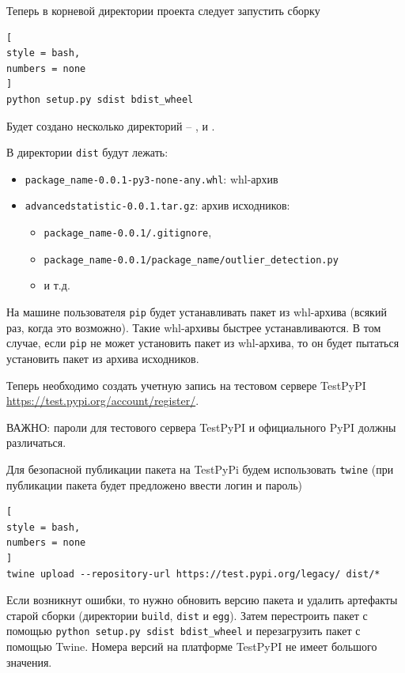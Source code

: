 \documentclass[%
	11pt,
	a4paper,
	utf8,
		]{article}
\begin{document}
Теперь в корневой директории проекта следует запустить сборку
\begin{lstlisting}[
style = bash,
numbers = none	
]
python setup.py sdist bdist_wheel
\end{lstlisting}

Будет создано несколько директорий -- ,  и .

В директории \texttt{dist} будут лежать:
\begin{itemize}
	\item \texttt{package\_name-0.0.1-py3-none-any.whl}: whl-архив
	
	\item \texttt{advancedstatistic-0.0.1.tar.gz}: архив исходников:
	\begin{itemize}
		\item \texttt{package\_name-0.0.1/.gitignore},
		
		\item \texttt{package\_name-0.0.1/package\_name/outlier\_detection.py}
		
		\item и т.д.
	\end{itemize}
\end{itemize}

На машине пользователя \texttt{pip} будет устанавливать пакет из whl-архива (всякий раз, когда это возможно). Такие whl-архивы быстрее устанавливаются. В том случае, если \texttt{pip} не может установить пакет из whl-архива, то он будет пытаться установить пакет из архива исходников.

Теперь необходимо создать учетную запись на тестовом сервере TestPyPI \url{https://test.pypi.org/account/register/}.

ВАЖНО: пароли для тестового сервера TestPyPI и официального PyPI должны различаться.

Для безопасной публикации пакета на TestPyPi будем использовать \texttt{twine} (при публикации пакета будет предложено ввести логин и пароль)
\begin{lstlisting}[
style = bash,
numbers = none
]
twine upload --repository-url https://test.pypi.org/legacy/ dist/*
\end{lstlisting}

Если возникнут ошибки, то нужно обновить версию пакета и удалить артефакты старой сборки (директории \texttt{build}, \texttt{dist} и \texttt{egg}). Затем перестроить пакет с помощью \texttt{python setup.py sdist bdist\_wheel} и перезагрузить пакет с помощью Twine. Номера версий на платформе TestPyPI не имеет большого значения.
\end{document}
